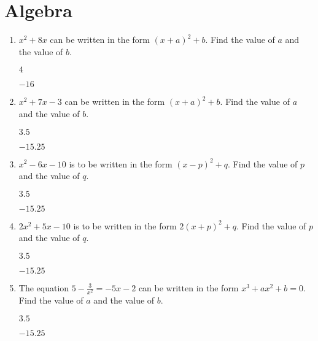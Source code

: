 \chapter{Algebra}

\begin{enumerate}[leftmargin=0cm] 

\item $x^2+8x$ can be written in the form $(x+a)^2+b$. Find the value of $a$ and the value of $b$.
    \begin{envAnswer}[blankline=3]         $     4          $ \end{envAnswer}
    \begin{envAnswer}[blankline=0]         $   -16          $ \end{envAnswer}


\item $x^2+7x -3$ can be written in the form $(x+a)^2+b$. Find the value of $a$ and the value of $b$.
    \begin{envAnswer}[blankline=3]         $     3.5        $ \end{envAnswer}
    \begin{envAnswer}[blankline=0]         $   -15.25       $ \end{envAnswer}


\item $x^2-6x -10$ is to be written in the form $(x-p)^2+q$. Find the value of $p$ and the value of $q$.
    \begin{envAnswer}[blankline=3]         $     3.5        $ \end{envAnswer}
    \begin{envAnswer}[blankline=0]         $   -15.25       $ \end{envAnswer}


\item $2x^2+5x -10$ is to be written in the form $2(x+p)^2+q$. Find the value of $p$ and the value of $q$.
    \begin{envAnswer}[blankline=3]         $     3.5        $ \end{envAnswer}
    \begin{envAnswer}[blankline=0]         $   -15.25       $ \end{envAnswer}


\item The equation $5-\frac{3}{x^2}=-5x-2$ can be written in the form $x^3+ax^2+b=0$. Find the value of $a$ and the value of $b$.
    \begin{envAnswer}[blankline=3]         $     3.5        $ \end{envAnswer}
    \begin{envAnswer}[blankline=0]         $   -15.25       $ \end{envAnswer}




\end{enumerate}

